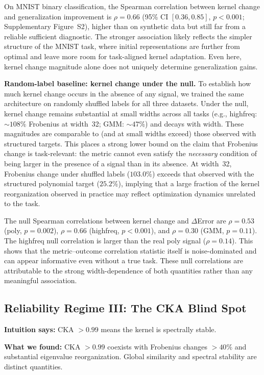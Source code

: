 \documentclass[10pt]{article}
\begin{document}
On MNIST binary classification, the Spearman correlation between kernel change and generalization improvement is $\rho=0.66$ (95\% CI $[0.36, 0.85]$, $p<0.001$; Supplementary Figure~S2), higher than on synthetic data but still far from a reliable sufficient diagnostic.  The stronger association likely reflects the simpler structure of the MNIST task, where initial representations are further from optimal and leave more room for task-aligned kernel adaptation.  Even here, kernel change magnitude alone does not uniquely determine generalization gains.

\textbf{Random-label baseline: kernel change under the null.}  To establish how much kernel change occurs in the absence of any signal, we trained the same architecture on randomly shuffled labels for all three datasets.  Under the null, kernel change remains substantial at small widths across all tasks (e.g., highfreq: $\sim\!108\%$ Frobenius at width~32; GMM: $\sim\!47\%$) and decays with width.  These magnitudes are comparable to (and at small widths exceed) those observed with structured targets. This places a strong lower bound on the claim that Frobenius change is task-relevant: the metric cannot even satisfy the \emph{necessary} condition of being larger in the presence of a signal than in its absence.  At width~32, Frobenius change under shuffled labels ($103.0\%$) exceeds that observed with the structured polynomial target ($25.2\%$), implying that a large fraction of the kernel reorganization observed in practice may reflect optimization dynamics unrelated to the task.

The null Spearman correlations between kernel change and $\Delta$Error are $\rho=0.53$ (poly, $p=0.002$), $\rho=0.66$ (highfreq, $p<0.001$), and $\rho=0.30$ (GMM, $p=0.11$).  The highfreq null correlation is larger than the real poly signal ($\rho=0.14$). This shows that the metric--outcome correlation statistic itself is noise-dominated and can appear informative even without a true task.  These null correlations are attributable to the strong width-dependence of both quantities rather than any meaningful association.

\subsection{Reliability Regime III: The CKA Blind Spot}
\label{sec:cka}

\noindent\textbf{Intuition says:} CKA $>0.99$ means the kernel is spectrally stable.

\noindent\textbf{What we found:} CKA $>0.99$ coexists with Frobenius changes $>40\%$ and substantial eigenvalue reorganization. Global similarity and spectral stability are distinct quantities.
\end{document}
